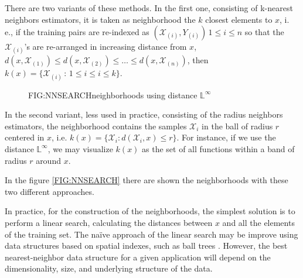 There are two variants of these methods. In the first one, consisting of
k-nearest neighbors estimators, it is taken as neighborhood the $k$ closest
elements to $x$, i. e., if the training pairs are re-indexed as
$(\mathcal{X}_{(i)}, Y_{(i)}) \, 1\le i\le n$ so that the
$\mathcal{X}_{(i)}$'s are re-arranged in increasing distance from $x$,
$d(x, \mathcal{X}_{(1)}) \le d(x, \mathcal{X}_{(2)}) \le \dots \le d(x, \mathcal{X}_{(n)})$,
 then $k(x) = \{\mathcal{X}_{(i)} \, : \, 1 \le i \le i\le k\}$.

\begin{figure}[Neighborhoods using distance $\mathbb{L}^\infty$]{FIG:NNSEARCH}{neighborhoods using distance $\mathbb{L}^\infty$}
	 \quad
\end{figure}

In the second variant, less used in practice, consisting of the radius neighbors
estimators, the neighborhood contains the samples $\mathcal{X}_i$ in the ball of
radius $r$ centered in $x$, i.e.
$k(x) = \{ \mathcal{X}_i : d(\mathcal{X}_i , x) \le r\}$. For instance, if we
use the distance $\mathbb{L}^\infty$, we may visualize $k(x)$ as the set of all
functions within a band  of radius $r$ around $x$.

In the figure \ref{FIG:NNSEARCH} there are shown the neighborhoods with these two different
approaches.

In practice, for the construction of the neighborhoods, the simplest solution is
 to perform a linear search, calculating the distances between $x$ and all the
 elements of the training set.
The naïve approach of the linear search may be improve using data structures
based on spatial indexes, such as ball trees \cite{Kumar2008}. However, the best
nearest-neighbor data structure for a given application will depend on the
dimensionality, size, and underlying structure of the data.
